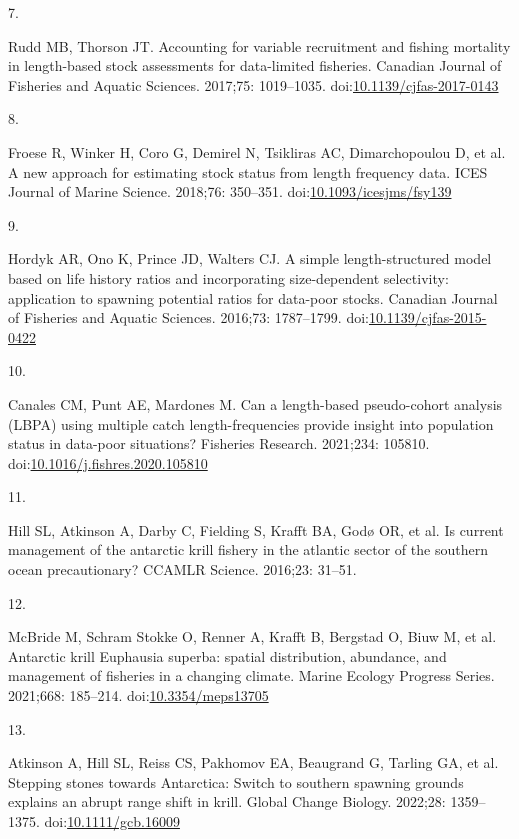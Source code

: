 \documentclass[
]{article}
\newlength{\cslhangindent}
\newlength{\csllabelwidth}
\newlength{\cslentryspacingunit} %
\newenvironment{CSLReferences}[2] %
 {%
  \setlength{\parindent}{0pt}
  \ifodd #1
  \let\oldpar\par
  \def\par{\hangindent=\cslhangindent\oldpar}
  \fi
  \setlength{\parskip}{#2\cslentryspacingunit}
 }%
 {}
\newcommand{\CSLLeftMargin}[1]{\parbox[t]{\csllabelwidth}{#1}}
\newcommand{\CSLRightInline}[1]{\parbox[t]{\linewidth - \csllabelwidth}{#1}\break}
\begin{document}
\begin{CSLReferences}{0}{0}
\leavevmode{}%
\CSLLeftMargin{7. }%
\CSLRightInline{Rudd MB, Thorson JT. {Accounting for variable
recruitment and fishing mortality in length-based stock assessments for
data-limited fisheries}. Canadian Journal of Fisheries and Aquatic
Sciences. 2017;75: 1019--1035.
doi:\href{https://doi.org/10.1139/cjfas-2017-0143}{10.1139/cjfas-2017-0143}}

\leavevmode{}%
\CSLLeftMargin{8. }%
\CSLRightInline{Froese R, Winker H, Coro G, Demirel N, Tsikliras AC,
Dimarchopoulou D, et al. {A new approach for estimating stock status
from length frequency data}. ICES Journal of Marine Science. 2018;76:
350--351.
doi:\href{https://doi.org/10.1093/icesjms/fsy139}{10.1093/icesjms/fsy139}}

\leavevmode{}%
\CSLLeftMargin{9. }%
\CSLRightInline{Hordyk AR, Ono K, Prince JD, Walters CJ. {A simple
length-structured model based on life history ratios and incorporating
size-dependent selectivity: application to spawning potential ratios for
data-poor stocks}. Canadian Journal of Fisheries and Aquatic Sciences.
2016;73: 1787--1799.
doi:\href{https://doi.org/10.1139/cjfas-2015-0422}{10.1139/cjfas-2015-0422}}

\leavevmode{}%
\CSLLeftMargin{10. }%
\CSLRightInline{Canales CM, Punt AE, Mardones M. {Can a length-based
pseudo-cohort analysis (LBPA) using multiple catch length-frequencies
provide insight into population status in data-poor situations?}
Fisheries Research. 2021;234: 105810.
doi:\href{https://doi.org/10.1016/j.fishres.2020.105810}{10.1016/j.fishres.2020.105810}}

\leavevmode{}%
\CSLLeftMargin{11. }%
\CSLRightInline{Hill SL, Atkinson A, Darby C, Fielding S, Krafft BA,
Godø OR, et al. {Is current management of the antarctic krill fishery in
the atlantic sector of the southern ocean precautionary?} CCAMLR
Science. 2016;23: 31--51. }

\leavevmode{}%
\CSLLeftMargin{12. }%
\CSLRightInline{McBride M, Schram Stokke O, Renner A, Krafft B, Bergstad
O, Biuw M, et al. {Antarctic krill Euphausia superba: spatial
distribution, abundance, and management of fisheries in a changing
climate}. Marine Ecology Progress Series. 2021;668: 185--214.
doi:\href{https://doi.org/10.3354/meps13705}{10.3354/meps13705}}

\leavevmode{}%
\CSLLeftMargin{13. }%
\CSLRightInline{Atkinson A, Hill SL, Reiss CS, Pakhomov EA, Beaugrand G,
Tarling GA, et al. {Stepping stones towards Antarctica: Switch to
southern spawning grounds explains an abrupt range shift in krill}.
Global Change Biology. 2022;28: 1359--1375.
doi:\href{https://doi.org/10.1111/gcb.16009}{10.1111/gcb.16009}}


\end{CSLReferences}
\end{document}
